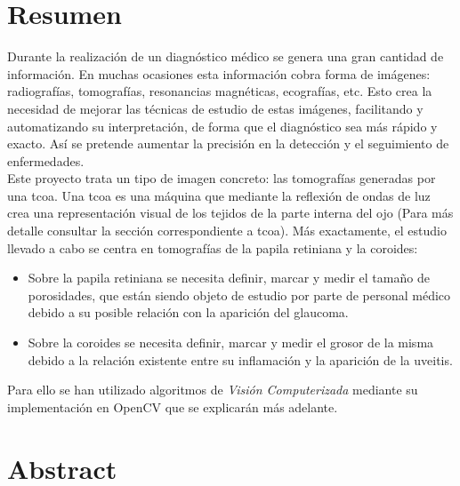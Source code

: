 \section*{Resumen}
Durante la realización de un diagnóstico médico se genera una gran
cantidad de información. En muchas ocasiones esta información cobra
forma de imágenes: radiografías, tomografías, resonancias magnéticas, 
ecografías, etc. Esto crea la necesidad de mejorar las técnicas
de estudio de estas imágenes, facilitando y automatizando su interpretación,
de forma que el diagnóstico sea más rápido y exacto. Así se pretende
aumentar la precisión en la detección y el seguimiento de enfermedades.\\
Este proyecto trata un tipo de imagen concreto: las tomografías generadas 
por una \gls{tcoa}. Una \gls{tcoa} es una máquina que mediante la reflexión 
de ondas de luz crea una representación visual de los tejidos de la parte 
interna del ojo (Para más detalle consultar la sección correspondiente 
a \gls{tcoa}). Más exactamente, el estudio llevado a cabo se centra en
tomografías de la papila retiniana y la coroides:
\begin{itemize}
\item Sobre la papila retiniana se necesita definir, marcar y medir el tamaño
  de porosidades, que están siendo objeto de estudio por parte de personal
  médico debido a su posible relación con la aparición del glaucoma.
\item Sobre la coroides se necesita definir, marcar y medir el grosor de 
  la misma debido a la relación existente entre su inflamación y la
  aparición de la uveitis.
\end{itemize}
Para ello se han utilizado algoritmos de \emph{Visión Computerizada} 
mediante su implementación en OpenCV que se explicarán más adelante.
\newpage
\section*{Abstract}

